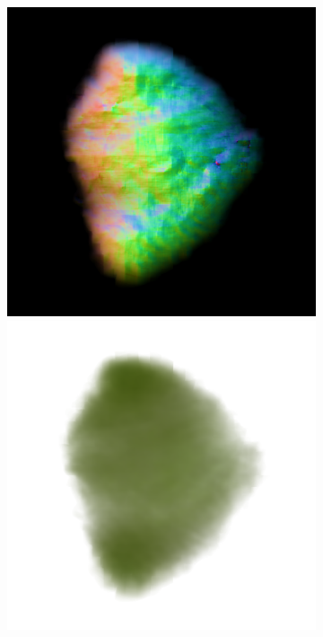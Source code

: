 \begin{figure}[ht]
    \centering
    \begin{subfigure}[b]{0.222\textwidth}
        \centering
        \fontsize{9pt}{7pt}\selectfont{}\vspace{.1cm}
        \includegraphics[width=\textwidth]{figures/appendix/magic123_coarse_robot_right_0_part2.png}
        \includegraphics[width=\textwidth]{figures/appendix/magic123_coarse_robot_right_0_part1.png}

\end{subfigure}
\end{figure}
